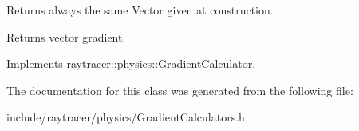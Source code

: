 Returns always the same Vector given at construction. 

\begin{DoxyReturn}{Returns}
vector gradient. 
\end{DoxyReturn}


Implements \hyperlink{classraytracer_1_1physics_1_1GradientCalculator_aeca43f861f5a5099a42bd8af1550f3dc}{raytracer\+::physics\+::\+Gradient\+Calculator}.



The documentation for this class was generated from the following file\+:\begin{DoxyCompactItemize}
\item 
include/raytracer/physics/Gradient\+Calculators.\+h\end{DoxyCompactItemize}
